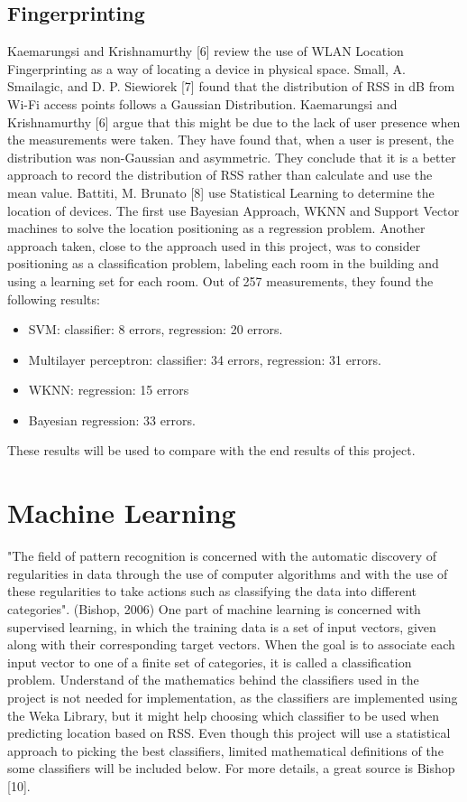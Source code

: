 \subsection{Fingerprinting}
Kaemarungsi and Krishnamurthy [6] review the use of WLAN Location Fingerprinting as a way of locating a device in physical space. Small, A. Smailagic, and D. P. Siewiorek [7] found that the distribution of RSS in dB from Wi-Fi access points follows a Gaussian Distribution. Kaemarungsi and Krishnamurthy [6] argue that this might be due to the lack of user presence when the measurements were taken. They have found that, when a user is present, the distribution was non-Gaussian and asymmetric. They conclude that it is a better approach to record the distribution of RSS rather than calculate and use the mean value. 
Battiti, M. Brunato [8] use Statistical Learning to determine the location of devices. The first use Bayesian Approach, WKNN and Support Vector machines to solve the location positioning as a regression problem. Another approach taken, close to the approach used in this project, was to consider positioning as a classification problem, labeling each room in the building and using a learning set for each room. Out of 257 measurements, they found the following results:
\begin{itemize}
\item SVM: classifier: 8 errors, regression: 20 errors.
\item Multilayer perceptron: classifier: 34 errors, regression: 31 errors.
\item WKNN: regression: 15 errors
\item Bayesian regression: 33 errors.
\end{itemize}
These results will be used to compare with the end results of this project.

\section{Machine Learning}

"The field of pattern recognition is concerned with the automatic discovery of regularities in data through the use of computer algorithms and with the use of these regularities to take actions such as classifying the data into different categories". (Bishop, 2006)
One part of machine learning is concerned with supervised learning, in which the training data is a set of input vectors, given along with their corresponding target vectors. When the goal is to associate each input vector to one of a finite set of categories, it is called a classification problem. Understand of the mathematics behind the classifiers used in the project is not needed for implementation, as the classifiers are implemented using the Weka Library, but it might help choosing which classifier to be used when predicting location based on RSS. Even though this project will use a statistical approach to picking the best classifiers, limited mathematical definitions of the some classifiers will be included below. For more details, a great source is Bishop [10].

